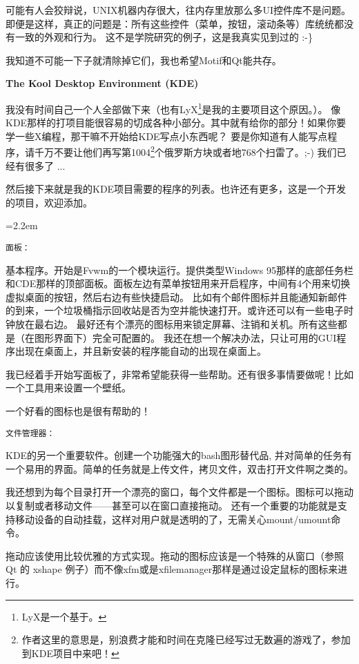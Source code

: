 \begin{insertnote}
可能有人会狡辩说，UNIX机器内存很大，往内存里放那么多UI控件库不是问题。即便是这样，真正的问题是：所有这些控件（菜单，按钮，滚动条等）库统统都没有一致的外观和行为。
这不是学院研究的例子，这是我真实见到过的 :-\}

我知道不可能一下子就清除掉它们，我也希望Motif和Qt能共存。


{\large \noindent \bf The Kool Desktop Environment (KDE)}

我没有时间自己一个人全部做下来（也有LyX\footnote{LyX是一个基于。}是我的主要项目这个原因。）。
像KDE那样的打项目能很容易的切成各种小部分。其中就有给你的部分！如果你要学一些X编程，那干嘛不开始给KDE写点小东西呢？
要是你知道有人能写点程序，请千万不要让他们再写第1004\footnote{作者这里的意思是，别浪费才能和时间在克隆已经写过无数遍的游戏了，参加到KDE项目中来吧！}个俄罗斯方块或者地768个扫雷了。;-) 我们已经有很多了 ... 

然后接下来就是我的KDE项目需要的程序的列表。也许还有更多，这是一个开发的项目，欢迎添加。

{
\leftskip=2.2em
\small 

{\noindent \tt 面板：}

    基本程序。开始是Fvwm的一个模块运行。提供类型Windows 95那样的底部任务栏和CDE那样的顶部面板。面板左边有菜单按钮用来开启程序，中间有4个用来切换虚拟桌面的按钮，然后右边有些快捷启动。
    比如有个邮件图标并且能通知新邮件的到来，一个垃圾桶指示回收站是否为空并能快速打开。或许还可以有一些电子时钟放在最右边。
    最好还有个漂亮的图标用来锁定屏幕、注销和关机。所有这些都是（在图形界面下）完全可配置的。
    我还在想一个解决办法，只让可用的GUI程序出现在桌面上，并且新安装的程序能自动的出现在桌面上。

    我已经着手开始写面板了，非常希望能获得一些帮助。还有很多事情要做呢！比如一个工具用来设置一个壁纸。
    
    一个好看的图标也是很有帮助的！

{ \noindent \tt 文件管理器：}

    KDE的另一个重要软件。创建一个功能强大的bash图形替代品, 并对简单的任务有一个易用的界面。简单的任务就是上传文件，拷贝文件，双击打开文件啊之类的。

    我还想到为每个目录打开一个漂亮的窗口，每个文件都是一个图标。图标可以拖动以复制或者移动文件——甚至可以在窗口直接拖动。
    还有一个重要的功能就是支持移动设备的自动挂载，这样对用户就是透明的了，无需关心mount/umount命令。

    拖动应该使用比较优雅的方式实现。拖动的图标应该是一个特殊的从窗口（参照 Qt 的 xshape 例子）而不像xfm或是xfilemanager那样是通过设定鼠标的图标来进行。

}
\end{insertnote}
